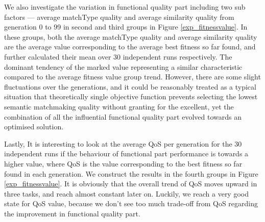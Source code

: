 \documentclass{llncs}
\begin{document}
We also investigate the variation in functional quality part including two sub factors --- average matchType quality and average similarity quality from generation 0 to 99 in second and third groups in Figure \ref{exp_fitnessvalue}.  In these groups,  both the average matchType quality and average similarity quality are the average value corresponding to the average best fitness so far found,  and further calculated their mean over 30 independent runs respectively. The dominant tendency of the marked value representing a similar characteristic compared to the average fitness value group trend. However, there are some slight fluctuations over the generations, and it could be reasonably treated as a typical situation that theoretically single objective function prevents selecting the lowest semantic matchmaking quality without granting for the excellent, yet the combination of all the influential functional quality part evolved towards an optimised solution.

Lastly, It is interesting to look at the average QoS per generation for the 30 independent runs if the behaviour of functional part performance is towards a higher value, where QoS is the value corresponding to the best fitness so far found in each generation. We construct the results in the fourth groups in Figure \ref{exp_fitnessvalue}. It is obviously that the overall trend of QoS moves upward in three tasks, and reach almost constant later on. Luckily, we reach a very good state for QoS value, because we don't see too much trade-off from QoS regarding the improvement in functional quality part. 
\end{document}

